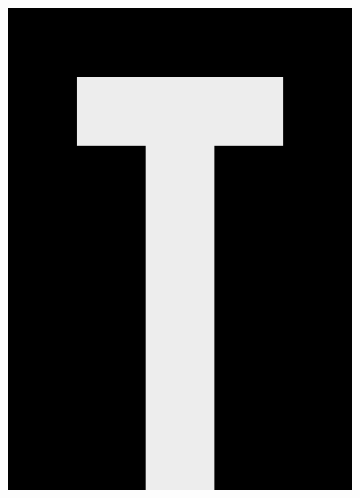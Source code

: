 \documentclass[12pt]{article}
\begin{document}
\begin{figure}
\centering
\begin{subfigure}[b]{.3\linewidth}
\includegraphics[width=\linewidth]{glyph-T.png}
\label{fig:glyph-T}
\end{subfigure}
\begin{subfigure}[b]{.3\linewidth}

\end{subfigure}
\end{figure}
\end{document}
